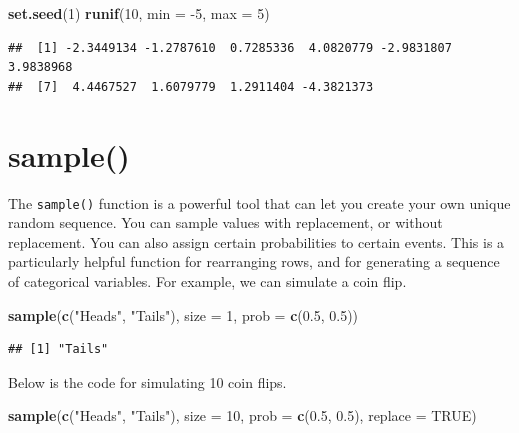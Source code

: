 \documentclass[
]{book}
\newenvironment{Shaded}{\begin{snugshade}}{\end{snugshade}}
\newcommand{\DataTypeTok}[1]{\textcolor[rgb]{0.13,0.29,0.53}{#1}}
\newcommand{\DecValTok}[1]{\textcolor[rgb]{0.00,0.00,0.81}{#1}}
\newcommand{\FloatTok}[1]{\textcolor[rgb]{0.00,0.00,0.81}{#1}}
\newcommand{\KeywordTok}[1]{\textcolor[rgb]{0.13,0.29,0.53}{\textbf{#1}}}
\newcommand{\NormalTok}[1]{#1}
\newcommand{\OtherTok}[1]{\textcolor[rgb]{0.56,0.35,0.01}{#1}}
\newcommand{\StringTok}[1]{\textcolor[rgb]{0.31,0.60,0.02}{#1}}
\begin{document}
\begin{Shaded}
\begin{Highlighting}[]
\KeywordTok{set.seed}\NormalTok{(}\DecValTok{1}\NormalTok{)}
\KeywordTok{runif}\NormalTok{(}\DecValTok{10}\NormalTok{, }\DataTypeTok{min =} \DecValTok{-5}\NormalTok{, }\DataTypeTok{max =} \DecValTok{5}\NormalTok{)}
\end{Highlighting}
\end{Shaded}

\begin{verbatim}
##  [1] -2.3449134 -1.2787610  0.7285336  4.0820779 -2.9831807  3.9838968
##  [7]  4.4467527  1.6079779  1.2911404 -4.3821373
\end{verbatim}

\hypertarget{sample}{%
\section{sample()}\label{sample}}

The \texttt{sample()} function is a powerful tool that can let you create your own unique random sequence. You can sample values with replacement, or without replacement. You can also assign certain probabilities to certain events. This is a particularly helpful function for rearranging rows, and for generating a sequence of categorical variables. For example, we can simulate a coin flip.

\begin{Shaded}
\begin{Highlighting}[]
\KeywordTok{sample}\NormalTok{(}\KeywordTok{c}\NormalTok{(}\StringTok{"Heads"}\NormalTok{, }\StringTok{"Tails"}\NormalTok{), }\DataTypeTok{size =} \DecValTok{1}\NormalTok{, }\DataTypeTok{prob =} \KeywordTok{c}\NormalTok{(}\FloatTok{0.5}\NormalTok{, }\FloatTok{0.5}\NormalTok{))}
\end{Highlighting}
\end{Shaded}

\begin{verbatim}
## [1] "Tails"
\end{verbatim}

Below is the code for simulating 10 coin flips.

\begin{Shaded}
\begin{Highlighting}[]
\KeywordTok{sample}\NormalTok{(}\KeywordTok{c}\NormalTok{(}\StringTok{"Heads"}\NormalTok{, }\StringTok{"Tails"}\NormalTok{), }\DataTypeTok{size =} \DecValTok{10}\NormalTok{, }\DataTypeTok{prob =} \KeywordTok{c}\NormalTok{(}\FloatTok{0.5}\NormalTok{, }\FloatTok{0.5}\NormalTok{), }\DataTypeTok{replace =} \OtherTok{TRUE}\NormalTok{)}
\end{Highlighting}
\end{Shaded}
\end{document}
